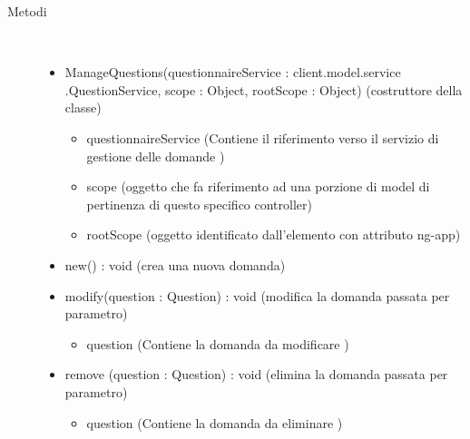 \begin{description}
\item[Metodi] \hfill \\
 \vspace{-7mm}
\begin{itemize}
\item ManageQuestions(questionnaireService : client.model.service .QuestionService, scope : Object, rootScope : Object) (costruttore della classe)\begin{itemize}
\item questionnaireService (Contiene il riferimento verso il servizio di gestione delle domande  )
\item scope (oggetto che fa riferimento ad una porzione di model di pertinenza di questo specifico controller)
\item rootScope (oggetto identificato dall’elemento con attributo ng-app)
\end{itemize}

\item new() : void (crea una nuova domanda)
\item modify(question : Question) : void (modifica la domanda passata per parametro)\begin{itemize}
\item question (Contiene  la domanda da modificare )
\end{itemize}

\item remove (question : Question) : void (elimina la domanda passata per parametro)\begin{itemize}
\item question (Contiene la domanda da eliminare )
\end{itemize}

\end{itemize}

\end{description}


